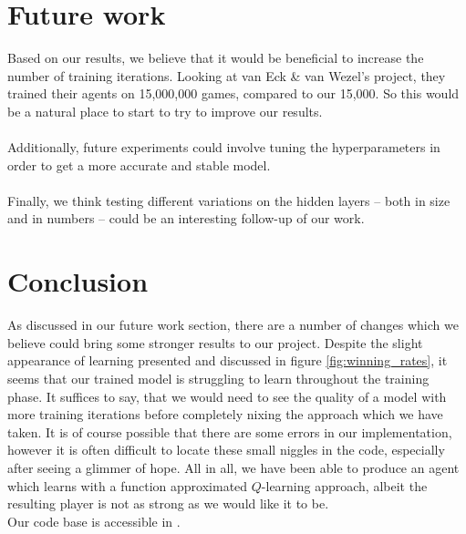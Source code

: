 \documentclass{article}
\begin{document}
\section{Future work}
Based on our results, we believe that it would be beneficial to increase the number of training iterations. Looking at van Eck \& van Wezel's project, they trained their agents on 15,000,000 games, compared to our 15,000. So this would be a natural place to start to try to improve our results.
\\\\
Additionally, future experiments could involve tuning the hyperparameters in order to get a more accurate and stable model.
\\\\
Finally, we think testing different variations on the hidden layers -- both in size and in numbers -- could be an interesting follow-up of our work. 

\section{Conclusion}
As discussed in our future work section, there are a number of changes which we believe could bring some stronger results to our project. Despite the slight appearance of learning presented and discussed in figure \ref{fig:winning_rates}, it seems that our trained model is struggling to learn throughout the training phase. It suffices to say, that we would need to see the quality of a model with more training iterations before completely nixing the approach which we have taken. It is of course possible that there are some errors in our implementation, however it is often difficult to locate these small niggles in the code, especially after seeing a glimmer of hope. All in all, we have been able to produce an agent which learns with a function approximated $Q$-learning approach, albeit the resulting player is not as strong as we would like it to be.
\\
Our code base is accessible in \cite{our_code}.
\\\\\\\\\\\\\\\\\\\\\\\\\\\\\\\\\\\\
\printbibliography
\end{document}

